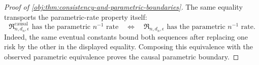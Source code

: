 \begin{proof}[Proof of \cref{obj:thm:consistency-and-parametric-boundaries}]
The same equality transports the parametric-rate property itself:
\[
\mathfrak R^{\mathrm{causal}}_{n,d_n,\epsilon}
\text{ has the parametric }n^{-1}\text{ rate}
\quad\Longleftrightarrow\quad
\mathfrak R_{n,d_n,\epsilon}
\text{ has the parametric }n^{-1}\text{ rate}.
\]
Indeed, the same eventual constants bound both sequences after replacing one risk by the other in the displayed equality.  Composing this equivalence with the observed parametric equivalence proves the causal parametric boundary. %
\end{proof}

